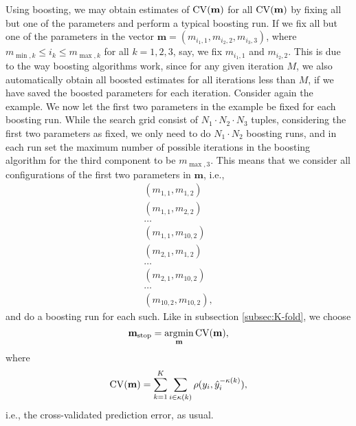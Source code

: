 Using boosting, we may obtain estimates of $\operatorname{CV}(\mathbf{m})$ for all $\operatorname{CV}(\mathbf{m})$ by fixing all but one of the parameters and perform a typical boosting run. If we fix all but one of the parameters in the vector $\mathbf{m}=\left(m_{i_1,1},m_{i_2,2},m_{i_3,3}\right)$, where $m_{\min,k}\leq i_k\leq m_{\max,k}$ for all $k=1,2,3$, say, we fix $m_{i_1,1}$ and $m_{i_2,2}$. This is due to the way boosting algorithms work, since for any given iteration $M$, we also automatically obtain all boosted estimates for all iterations less than $M$, if we have saved the boosted parameters for each iteration. Consider again the example. We now let the first two parameters in the example be fixed for each boosting run. While the search grid consist of $N_1\cdot N_2\cdot N_3$ tuples, considering the first two parameters as fixed, we only need to do $N_1\cdot N_2$ boosting runs, and in each run set the maximum number of possible iterations in the boosting algorithm for the third component to be $m_{\max,3}$. This means that we consider all configurations of the first two parameters in $\mathbf{m}$, i.e.,
\begin{align*}
    \left(m_{1,1},m_{1,2}\right) \\
    \left(m_{1,1},m_{2,2}\right) \\
    \ldots \\
    \left(m_{1,1},m_{10,2}\right) \\
    \left(m_{2,1},m_{1,2}\right) \\
    \ldots \\
    \left(m_{2,1},m_{10,2}\right) \\
    \ldots \\
    \left(m_{10,2},m_{10,2}\right),
\end{align*}
and do a boosting run for each such. Like in subsection \ref{subsec:K-fold}, we choose
\begin{equation*}
    \mathbf{m}_{\text{stop}}=\operatorname*{argmin}_{\mathbf{m}}\operatorname{CV}(\mathbf{m}),
\end{equation*}
where
\begin{equation*}
    \operatorname{CV}(\mathbf{m})=\sum_{k=1}^K\sum_{i\in\kappa(k)}\rho(y_i,\hat{y}_i^{-\kappa(k)}),
\end{equation*}
i.e., the cross-validated prediction error, as usual.
